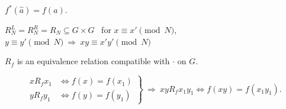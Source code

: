\documentclass[12pt]{article}
\begin{document}
\noindent $f^*(\hat a) = f(a)$.

\bigskip
\noindent $R_N^L = R_N^R = R_N \subseteq G\times G$ \ for $x\equiv x' \pmod N$, $y\equiv y' \pmod N \ \Rightarrow \ xy\equiv x'y' \pmod N$

\bigskip
\noindent $R_f$ is an equivalence relation compatible with $\cdot$ on $G$.

\[
\left.\begin{aligned}
xR_fx_1 &\Leftrightarrow f(x)=f(x_1)\\
yR_fy_1 &\Leftrightarrow f(y)=f(y_1)
\end{aligned}\right\} \ \Rightarrow \ xyR_fx_1y_1 \Leftrightarrow f(xy)=f(x_1y_1).
\]
\end{document}
